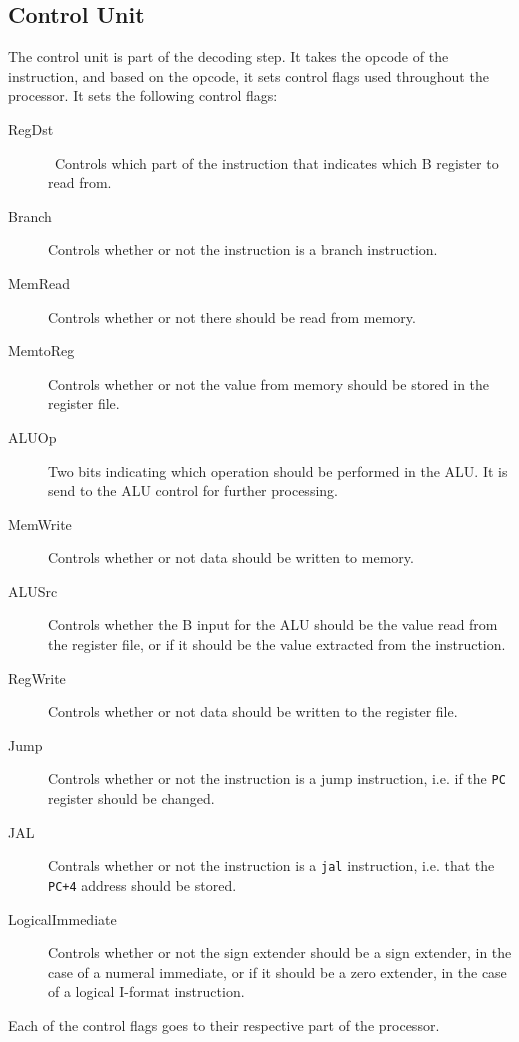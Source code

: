 \subsection{Control Unit}
\label{sec:control-unit}
The control unit is part of the decoding step. It takes the opcode of the
instruction, and based on the opcode, it sets control flags used throughout the
processor. It sets the following control flags:
\begin{description}
    \item[RegDst] Controls which part of the instruction that indicates which
        B register to read from.

    \item[Branch] Controls whether or not the instruction is a branch
        instruction.

    \item[MemRead] Controls whether or not there should be read from memory.

    \item[MemtoReg] Controls whether or not the value from memory should be
        stored in the register file.

    \item[ALUOp] Two bits indicating which operation should be performed in
        the ALU. It is send to the ALU control for further processing.

    \item[MemWrite] Controls whether or not data should be written to memory.

    \item[ALUSrc] Controls whether the B input for the ALU should be the
        value read from the register file, or if it should be the value
        extracted from the instruction.

    \item[RegWrite] Controls whether or not data should be written to the
        register file.

    \item[Jump] Controls whether or not the instruction is a jump instruction,
        i.e. if the \texttt{PC} register should be changed.

    \item[JAL] Contrals whether or not the instruction is a \texttt{jal}
        instruction, i.e. that the \texttt{PC+4} address should be stored.

    \item[LogicalImmediate] Controls whether or not the sign extender should
        be a sign extender, in the case of a numeral immediate, or if it
        should be a zero extender, in the case of a logical I-format
        instruction.
\end{description}
Each of the control flags goes to their respective part of the processor.

